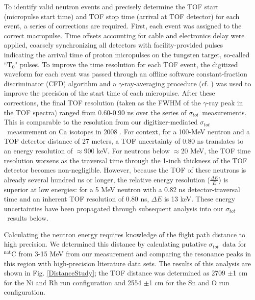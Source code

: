 \documentclass[twocolumn,secnumarabic,amssymb, nobibnotes, aps, prl,
superscriptaddress, nobalancelastpage]{revtex4}
\newcommand{\tot}{\ensuremath{\sigma_{tot}}}
\newcommand{\tZero}{T\ensuremath{_{0}}}
\begin{document}
To identify valid neutron events and precisely determine the TOF start (micropulse start 
time) and TOF stop time (arrival at TOF detector) for each event, a series of corrections 
are required.  First, each event was assigned to the correct macropulse.
Time offsets accounting for cable and
electronics delay were applied, coarsely synchronizing all detectors with
facility-provided pulses indicating the arrival time of proton micropulses on the
tungsten target, so-called ``\tZero" pulses.
To improve the time resolution for each TOF
event, the digitized waveform for each event was passed 
through an offline software constant-fraction discriminator (CFD) algorithm
and a $\gamma$-ray-averaging
procedure (cf. \cite{Shane2010}) was used to improve the precision of the start 
time of each micropulse.  After these corrections, the final TOF resolution
(taken as the FWHM of the $\gamma$-ray peak in the TOF spectra) ranged from
0.60-0.90 ns over the series of \tot\ measurements.
This is comparable to the resolution from 
our digitizer-mediated \tot\ measurement on Ca isotopes in 2008 \cite{Shane2010}.
For context, for a 100-MeV neutron and a TOF detector distance of 27 meters, a TOF 
uncertainty of 0.80 ns translates to an energy resolution of $\approx$900 keV.
For neutrons below $\approx$20 MeV, the TOF time resolution worsens as the traversal time 
through the 1-inch thickness of the TOF detector becomes non-negligible.
However, because the TOF of these neutrons is already several hundred ns or
longer, the relative energy resolution ($\frac{\Delta E}{E}$) is
superior at low energies: for a 5 MeV neutron with a 0.82 ns detector-traversal time and
an inherent TOF resolution of 0.80 ns, $\Delta E$ is 13 keV. These energy uncertainties
have been propagated through subsequent analysis into our \tot\ results below.

Calculating the neutron energy requires knowledge of the flight path
distance to high precision. We determined this distance by calculating 
putative \tot\ data for $^{\text{nat}}$C from 3-15 MeV from our measurement and 
comparing the resonance peaks in this region with high-precision literature data
sets. The results of this analysis are shown in Fig. \ref{DistanceStudy};
the TOF distance was determined as 2709 $\pm$1 cm for the Ni and Rh
run configuration and 2554 $\pm$1 cm for the Sn and O run configuration.
\end{document}
